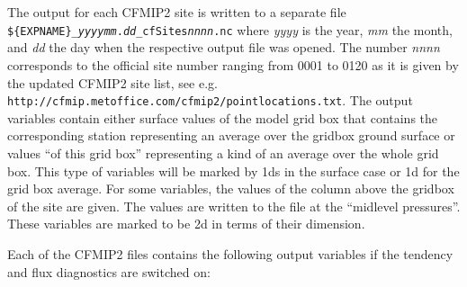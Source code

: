 \begin{appendix}
The output for each CFMIP2 site is written to a separate file {\tt
  \$\{EXPNAME\}\_{\it yyyymm}.{\it dd}\_cfSites{\it nnnn}.nc} where
{\it yyyy} is the 
year, {\it mm} the month, and {\it dd} the day when the respective
output file was opened. The number {\it nnnn} corresponds to the
official site number ranging from 0001 to 0120 as it is given by
the updated CFMIP2 site list, see e.g.\newline
{\tt http://cfmip.metoffice.com/cfmip2/pointlocations.txt}.
The output variables contain either surface values of the model grid box
that contains the corresponding station representing an average over
the gridbox ground surface or values ``of this grid
box'' representing a kind of an average over the whole grid box. This
type of variables will be marked by 1ds in the surface case or 1d for
the grid box average. For some variables, the values of the column
above the gridbox of the site are given. The values are written to the
file at the ``midlevel pressures''. These variables are marked to be 2d
in terms of 
their dimension.

Each of the CFMIP2 files contains the following output variables if the
tendency and flux diagnostics are switched on:

\setlength{\LTcapwidth}{\textwidth}
\setlength{\LTleft}{0pt}\setlength{\LTright}{0pt}


\end{appendix}
